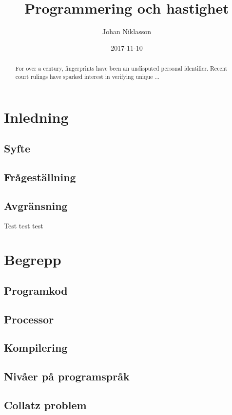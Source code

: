 \documentclass[12pt,swedish]{article}
\title{Programmering och hastighet}
\author{Johan Niklasson}
\date{2017-11-10}
\begin{document}
    \maketitle
    \begin{abstract}
        For over a century, fingerprints have been an undisputed
        personal identifier.  Recent court rulings have sparked
        interest in verifying unique ...
    \end{abstract}

    \newpage
    \tableofcontents
    \clearpage

    \section{Inledning}
    \subsection{Syfte}
    \subsection{Frågeställning}
    \subsection{Avgränsning}
    Test test test \cite{maloney_resnick_rusk_silverman_eastmond_2010}

    \section{Begrepp}
    \subsection{Programkod}
    \subsection{Processor}
    \subsection{Kompilering}
    \subsection{Nivåer på programspråk}
    \subsection{Collatz problem}
\end{document}
